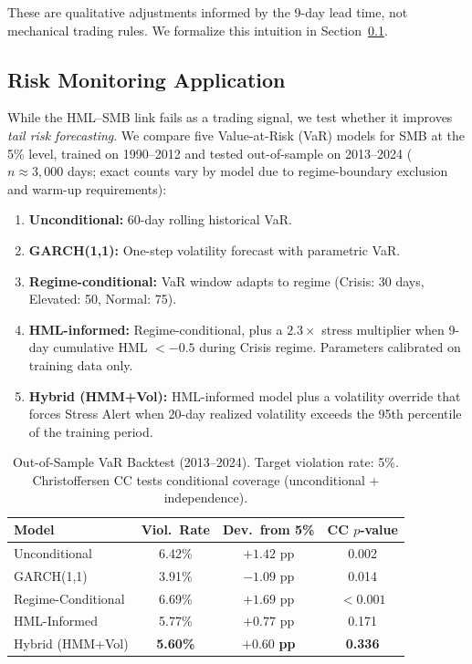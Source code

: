 \documentclass{uai2026}
\begin{document}
These are qualitative adjustments informed by the 9-day lead time, not mechanical
trading rules. We formalize this intuition in Section~\ref{sec:risk_monitoring}.

\subsection{Risk Monitoring Application}
\label{sec:risk_monitoring}

While the HML--SMB link fails as a trading signal, we test whether it improves
\emph{tail risk forecasting}. We compare five Value-at-Risk (VaR) models for SMB
at the 5\% level, trained on 1990--2012 and tested out-of-sample on 2013--2024
($n \approx 3{,}000$ days; exact counts vary by model due to regime-boundary
exclusion and warm-up requirements):

\begin{enumerate}
    \item \textbf{Unconditional:} 60-day rolling historical VaR.
    \item \textbf{GARCH(1,1):} One-step volatility forecast with parametric VaR.
    \item \textbf{Regime-conditional:} VaR window adapts to regime
    (Crisis: 30 days, Elevated: 50, Normal: 75).
    \item \textbf{HML-informed:} Regime-conditional, plus a $2.3\times$ stress
    multiplier when 9-day cumulative HML $< -0.5$ during Crisis regime.
    Parameters calibrated on training data only.
    \item \textbf{Hybrid (HMM+Vol):} HML-informed model plus a volatility
    override that forces Stress Alert when 20-day realized volatility exceeds
    the 95th percentile of the training period.
\end{enumerate}

\begin{table}[t]
\centering
\setlength{\tabcolsep}{4pt}
\caption[Out-of-Sample VaR Backtest (2013--2024)]{Out-of-Sample VaR Backtest (2013--2024). Target violation rate: 5\%.
Christoffersen CC tests conditional coverage (unconditional + independence).}
\label{tab:var}
\small
\begin{tabular}{lccc}
\toprule
Model & Viol.\ Rate & Dev.\ from 5\% & CC $p$-value \\
\midrule
Unconditional & 6.42\% & $+1.42$ pp & 0.002 \\
GARCH(1,1) & 3.91\% & $-1.09$ pp & 0.014 \\
Regime-Conditional & 6.69\% & $+1.69$ pp & $< 0.001$ \\
HML-Informed & 5.77\% & $+0.77$ pp & 0.171 \\
Hybrid (HMM+Vol) & \textbf{5.60\%} & $\mathbf{+0.60}$ \textbf{pp} & \textbf{0.336} \\
\bottomrule
\end{tabular}
\end{table}
\setlength{\tabcolsep}{6pt}
\end{document}
